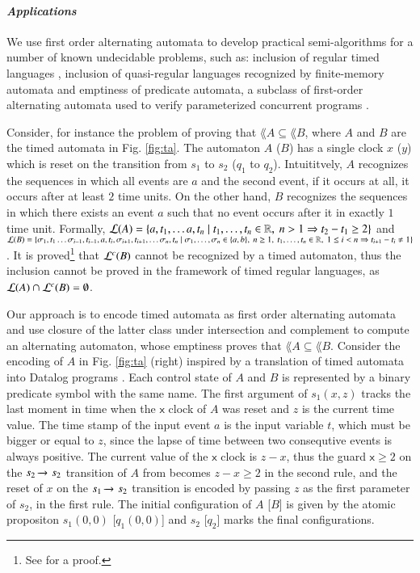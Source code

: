 \paragraph{\em Applications}
We use first order alternating automata to develop practical
semi-algorithms for a number of known undecidable problems, such as:
inclusion of regular timed languages \cite{AlurDill94}, inclusion of
quasi-regular languages recognized by finite-memory automata
\cite{KaminskiFrancez94} and emptiness of predicate automata, a
subclass of first-order alternating automata used to verify
parameterized concurrent programs \cite{Farzan15,Farzan16}.

Consider, for instance the problem of proving that $\lang{A} \subseteq
\lang{B}$, where $A$ and $B$ are the timed automata in
Fig. \ref{fig:ta}. The automaton $A$ ($B$) has a single clock $x$
($y$) which is reset on the transition from $s_1$ to $s_2$ ($q_1$ to
$q_2$). Intuititvely, $A$ recognizes the sequences in which all events
are $a$ and the second event, if it occurs at all, it occurs after at
least $2$ time units. On the other hand, $B$ recognizes the sequences
in which there exists an event $a$ such that no event occurs after it
in exactly $1$ time unit. Formally, ${\mathcal L}({A}) = \{ a, t_1, \ldots a,
  t_n \mid t_1, \ldots, t_n \in {\bf \mathbb{R}},~ n > 1 \Rightarrow t_2-t_1 \geq
  2 \}$ and ${\mathcal L}({B}) = \{ \sigma_1, t_1 \ldots \sigma_{i-1}, t_{i-1},
  a, t_i, \sigma_{i+1}, t_{i+1}, \ldots \sigma_n, t_n \mid \sigma_1,
  \ldots, \sigma_n \in \{ a,b \},~ n \geq 1,~ t_1, \ldots, t_n \in
  {\bf \mathbb{R}},~ 1 \leq i < n \Rightarrow t_{i+1}-t_i \neq 1 \}$. It is
proved\footnote{See \cite[Theorem 1]{AlurMadhusudan04} for a proof.}
that ${\mathcal L}^c({B})$ cannot be recognized by a timed automaton, thus the
inclusion cannot be proved in the framework of timed regular
languages, as ${\mathcal L}({A}) \cap {\mathcal L}^c({B}) = \emptyset$.

Our approach is to encode timed automata as first order alternating
automata and use closure of the latter class under intersection and
complement to compute an alternating automaton, whose emptiness proves
that $\lang{A} \subseteq \lang{B}$. Consider the encoding of $A$ in
Fig. \ref{fig:ta} (right) inspired by a translation of timed automata
into Datalog programs \cite{Fribourg98}.  Each control state of $A$
and $B$ is represented by a binary predicate symbol with the same
name. The first argument of $s_1(x,z)$ tracks the last moment in time
when the $\mathsf{x}$ clock of $A$ was reset and $z$ is the current
time value. The time stamp of the input event $a$ is the input
variable $t$, which must be bigger or equal to $z$, since the lapse of
time between two consequtive events is always positive. The current
value of the $\mathsf{x}$ clock is $z-x$, thus the guard $\mathsf{x}
\geq 2$ on the $s_2 \xrightarrow{{\scriptscriptstyle }}_{{\scriptstyle }} s_2$ transition of $A$ from becomes
$z-x \geq 2$ in the second rule, and the reset of $x$ on the $s_1
\xrightarrow{{\scriptscriptstyle }}_{{\scriptstyle }} s_2$ transition is encoded by passing $z$ as the first
parameter of $s_2$, in the first rule. The initial configuration of
$A$ [$B$] is given by the atomic propositon $s_1(0,0)$ [$q_1(0,0)$]
and $s_2$ [$q_2$] marks the final configurations.

